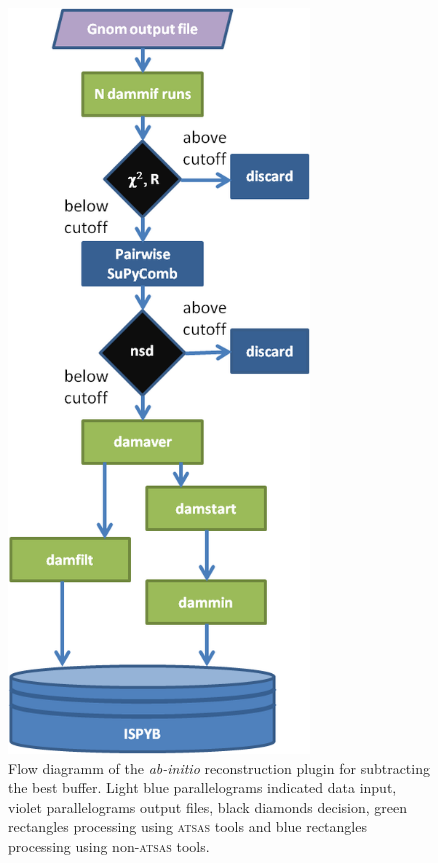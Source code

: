 \documentclass[preprint,pdf]{iucr}              %
\begin{document}
\begin{figure}
\centering
\includegraphics[width=8cm]{model.png}%
\caption{Flow diagramm of the \textit{ab-initio} reconstruction plugin for subtracting the best buffer. Light blue parallelograms indicated data input, violet  parallelograms output files, black diamonds decision, green rectangles processing using \textsc{atsas} tools and blue rectangles processing using non-\textsc{atsas} tools. }
\label{fgr:modeling}
\end{figure}
\end{document}
